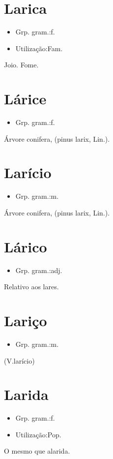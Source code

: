 \section{Larica}
\begin{itemize}
\item {Grp. gram.:f.}
\end{itemize}
\begin{itemize}
\item {Utilização:Fam.}
\end{itemize}
Joio.
Fome.
\section{Lárice}
\begin{itemize}
\item {Grp. gram.:f.}
\end{itemize}
Árvore conifera, (\textunderscore pinus larix\textunderscore , Lin.).
\section{Larício}
\begin{itemize}
\item {Grp. gram.:m.}
\end{itemize}
Árvore conifera, (\textunderscore pinus larix\textunderscore , Lin.).
\section{Lárico}
\begin{itemize}
\item {Grp. gram.:adj.}
\end{itemize}
Relativo aos lares.
\section{Lariço}
\begin{itemize}
\item {Grp. gram.:m.}
\end{itemize}
(V.larício)
\section{Larida}
\begin{itemize}
\item {Grp. gram.:f.}
\end{itemize}
\begin{itemize}
\item {Utilização:Pop.}
\end{itemize}
O mesmo que \textunderscore alarida\textunderscore .

